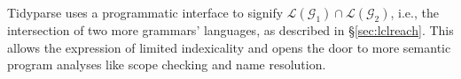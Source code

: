 \noindent Tidyparse uses a programmatic interface to signify $\mathcal{L}(\mathcal{G}_1)\cap\mathcal{L}(\mathcal{G}_2)$, i.e., the intersection of two more grammars' languages, as described in \S\ref{sec:lclreach}. This allows the expression of limited indexicality and opens the door to more semantic program analyses like scope checking and name resolution.

%

